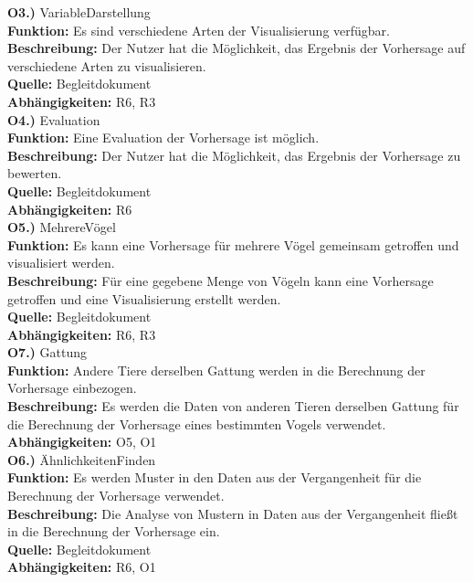 \documentclass[12pt]{article} %
\begin{document}
\textbf{O3.)} VariableDarstellung \\
\textbf{Funktion:} Es sind verschiedene Arten der Visualisierung verfügbar. \\
\textbf{Beschreibung:} Der Nutzer hat die Möglichkeit, das Ergebnis der Vorhersage auf verschiedene Arten zu visualisieren. \\
\textbf{Quelle:} Begleitdokument \\
\textbf{Abhängigkeiten:} R6, R3 \\

\textbf{O4.)} Evaluation \\
\textbf{Funktion:} Eine Evaluation der Vorhersage ist möglich. \\
\textbf{Beschreibung:} Der Nutzer hat die Möglichkeit, das Ergebnis der Vorhersage zu bewerten. \\
\textbf{Quelle:} Begleitdokument \\
\textbf{Abhängigkeiten:} R6 \\

\textbf{O5.)} MehrereVögel \\
\textbf{Funktion:} Es kann eine Vorhersage für mehrere Vögel gemeinsam getroffen und visualisiert werden. \\
\textbf{Beschreibung:} Für eine gegebene Menge von Vögeln kann eine Vorhersage getroffen und eine Visualisierung erstellt werden. \\
\textbf{Quelle:} Begleitdokument \\
\textbf{Abhängigkeiten:} R6, R3 \\

\textbf{O7.)} Gattung \\
\textbf{Funktion:} Andere Tiere derselben Gattung werden in die Berechnung der Vorhersage einbezogen. \\
\textbf{Beschreibung:} Es werden die Daten von anderen Tieren derselben Gattung für die Berechnung der Vorhersage eines bestimmten Vogels verwendet. \\
\textbf{Abhängigkeiten:} O5, O1 \\

\textbf{O6.)} ÄhnlichkeitenFinden \\
\textbf{Funktion:} Es werden Muster in den Daten aus der Vergangenheit für die Berechnung der Vorhersage verwendet. \\
\textbf{Beschreibung:} Die Analyse von Mustern in Daten aus der Vergangenheit fließt in die Berechnung der Vorhersage ein. \\
\textbf{Quelle:} Begleitdokument \\
\textbf{Abhängigkeiten:} R6, O1 \\
\end{document}
